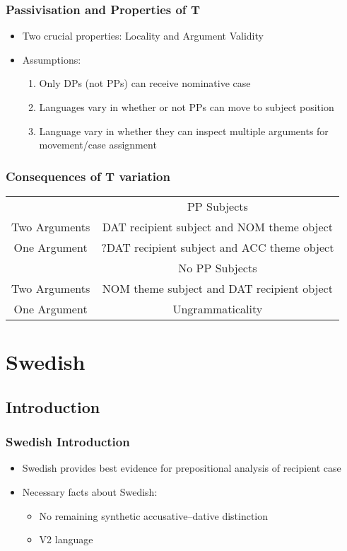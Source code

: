\documentclass{beamer}
\begin{document}
\begin{frame}
	\frametitle{Passivisation and Properties of T}
	\begin{itemize}
		\item Two crucial properties: Locality and Argument Validity
		\item Assumptions:
		\begin{enumerate}
			\item Only DPs (not PPs) can receive nominative case
			\item Languages vary in whether or not PPs can move to subject position
			\item Language vary in whether they can inspect multiple arguments for movement/case assignment
		\end{enumerate}
	\end{itemize}
\end{frame}

\begin{frame}
	\frametitle{Consequences of T variation}
	\begin{tabular}{cc}
		&	PP Subjects \\
Two Arguments	& DAT recipient subject and NOM theme object \\
One Argument    & ?DAT recipient subject and ACC theme object\\
\hline
	      & No PP Subjects \\
Two Arguments & NOM theme subject and DAT recipient object\\
One Argument  & Ungrammaticality\\
	\end{tabular}
\end{frame}

\section{Swedish}
\subsection{Introduction}
\begin{frame}
	\frametitle{Swedish Introduction}
	\begin{itemize}
		\item Swedish provides best evidence for prepositional analysis of recipient case
		\item Necessary facts about Swedish:
		\begin{itemize}
			\item No remaining synthetic accusative--dative distinction
			\item V2 language
		\end{itemize}
	\end{itemize}
\end{frame}
\end{document}
